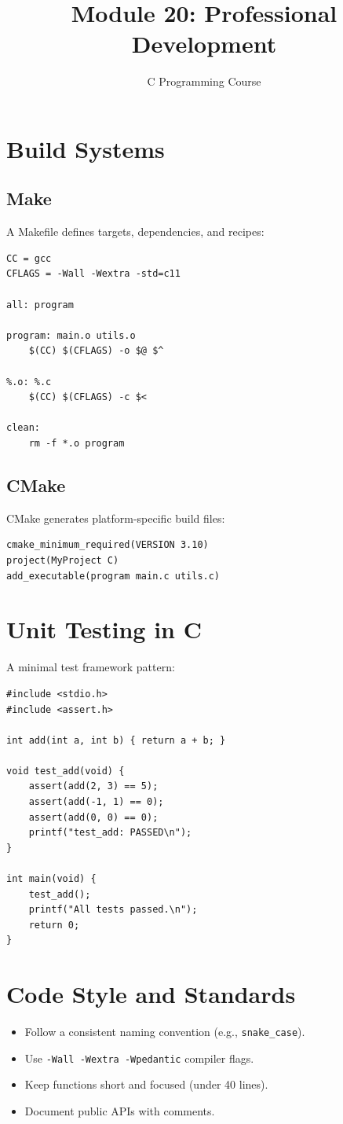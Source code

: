 \documentclass[11pt,a4paper]{article}
\title{Module 20: Professional Development}
\author{C Programming Course}
\date{}
\begin{document}
\maketitle
\thispagestyle{fancy}

\section{Build Systems}
\subsection{Make}
A Makefile defines targets, dependencies, and recipes:
\begin{lstlisting}
CC = gcc
CFLAGS = -Wall -Wextra -std=c11

all: program

program: main.o utils.o
	$(CC) $(CFLAGS) -o $@ $^

%.o: %.c
	$(CC) $(CFLAGS) -c $<

clean:
	rm -f *.o program
\end{lstlisting}

\subsection{CMake}
CMake generates platform-specific build files:
\begin{verbatim}
cmake_minimum_required(VERSION 3.10)
project(MyProject C)
add_executable(program main.c utils.c)
\end{verbatim}

\section{Unit Testing in C}
A minimal test framework pattern:
\begin{lstlisting}
#include <stdio.h>
#include <assert.h>

int add(int a, int b) { return a + b; }

void test_add(void) {
    assert(add(2, 3) == 5);
    assert(add(-1, 1) == 0);
    assert(add(0, 0) == 0);
    printf("test_add: PASSED\n");
}

int main(void) {
    test_add();
    printf("All tests passed.\n");
    return 0;
}
\end{lstlisting}

\section{Code Style and Standards}
\begin{itemize}
  \item Follow a consistent naming convention (e.g., \texttt{snake\_case}).
  \item Use \texttt{-Wall -Wextra -Wpedantic} compiler flags.
  \item Keep functions short and focused (under 40 lines).
  \item Document public APIs with comments.
\end{itemize}
\end{document}
